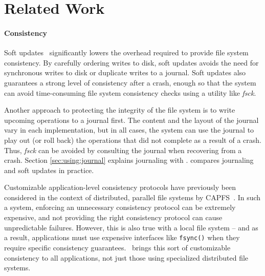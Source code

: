 \section{Related Work}
\label{sec:related}

\paragraph{Consistency}

Soft updates~\cite{ganger00soft} 
significantly lowers the overhead required to provide file system
consistency. By carefully ordering writes to disk, soft updates avoids the need
for synchronous writes to disk or duplicate writes to a journal. Soft updates
also guarantees a strong level of consistency after a crash, enough so that the
system can avoid time-consuming file system consistency checks using a utility
like \emph{fsck}. 


Another approach to protecting the integrity of the file system is to write
upcoming operations to a journal first. The content and the layout of the
journal vary in each implementation, but in all cases, the system can use
the journal to play out (or roll back) the operations that did not complete
as a result of a crash. Thus, \emph{fsck} can be avoided by consulting the
journal when recovering from a crash. Section \ref{sec:using:journal}
explains journaling with \chdescs. \cite{seltzer00journaling} compares
journaling and soft updates in practice.

\cite{nightingale06rethink}
\cite{sivathanu05ensuring}

Customizable application-level consistency protocols have previously been
considered in the context of distributed, parallel file systems by
CAPFS~\cite{vilayannur05providing}. In such a system, enforcing an unnecessary
consistency protocol can be extremely expensive, and not providing the right
consistency protocol can cause unpredictable failures. However, this is also
true with a local file system -- and as a result, applications must use
expensive interfaces like \texttt{fsync()} when they require specific
consistency guarantees. \Kudos\ brings this sort of customizable consistency to
all applications, not just those using specialized distributed file systems.


